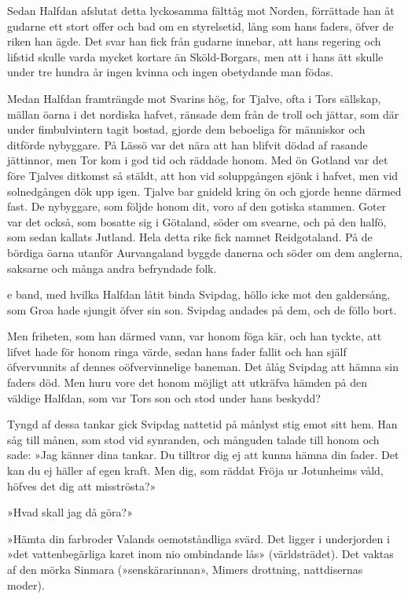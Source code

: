 Sedan Halfdan afslutat detta lyckosamma fälttåg mot Norden, förrättade
han åt gudarne ett stort offer och bad om en styrelsetid, lång som hans
faders, öfver de riken han ägde. Det svar han fick från gudarne innebar,
att hans regering och lifstid skulle varda mycket kortare än
Sköld-Borgars, men att i hans ätt skulle under tre hundra år ingen
kvinna och ingen obetydande man födas.

Medan Halfdan framträngde mot Svarins hög, for Tjalve, ofta i Tors
sällskap, mällan öarna i det nordiska hafvet, ränsade dem från de troll
och jättar, som där under fimbulvintern tagit bostad, gjorde dem
beboeliga för människor och ditförde nybyggare. På Lässö var det nära
att han blifvit dödad af rasande jättinnor, men Tor kom i god tid och
räddade honom. Med ön Gotland var det före Tjalves ditkomst så stäldt,
att hon vid soluppgången sjönk i hafvet, men vid solnedgången dök upp
igen. Tjalve bar gnideld kring ön och gjorde henne därmed fast. De
nybyggare, som följde honom dit, voro af den gotiska stammen. Goter var
det
också, som bosatte sig i Götaland, söder om svearne, och på den halfö,
som sedan kallats Jutland. Hela detta rike fick namnet Reidgotaland. På
de bördiga öarna utanför Aurvangaland byggde danerna och söder om dem
anglerna, saksarne och många andra befryndade folk.

\endSecII


\dropcapD e band, med hvilka Halfdan låtit binda Svipdag, höllo icke mot den
galdersång, som Groa hade sjungit öfver sin son. Svipdag andades på dem,
och de föllo bort.

Men friheten, som han därmed vann, var honom föga kär, och han tyckte,
att lifvet hade för honom ringa värde, sedan hans fader fallit och han
själf öfvervunnits af dennes oöfvervinnelige baneman. Det ålåg Svipdag
att hämna sin faders död. Men huru vore det honom möjligt att utkräfva
hämden på den väldige Halfdan, som var Tors son och stod under hans
beskydd?

Tyngd af dessa tankar gick Svipdag nattetid på månlyst stig emot sitt
hem. Han såg till månen, som stod vid synranden, och månguden talade
till honom och sade: »Jag känner dina tankar. Du tilltror dig ej att
kunna hämna din fader. Det kan du ej häller af egen kraft. Men dig, som
räddat Fröja ur Jotunheims våld, höfves det dig att misströsta?»

»Hvad skall jag då göra?»

»Hämta din farbroder Valands oemotståndliga svärd. Det ligger i
underjorden i »det vattenbegärliga karet inom nio ombindande lås»
(världsträdet). Det vaktas af den mörka Sinmara (»senskärarinnan»,
Mimers drottning, nattdisernas moder).

